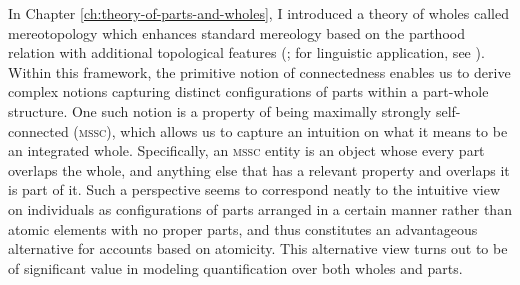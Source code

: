 In Chapter \ref{ch:theory-of-parts-and-wholes}, I introduced a theory of wholes called mereo\-topology which enhances standard mereology based on the parthood relation with additional topological features (\citealt{casati_varzi1999parts}; for linguistic application, see \citealt{grimm2012degrees,grimm2012number}). Within this framework, the primitive notion of connectedness enables us to derive complex notions capturing distinct configurations of parts within a part-whole structure. One such notion is a property of being maximally strongly self-connected (\textsc{mssc}), which allows us to capture an intuition on what it means to be an integrated whole. Specifically, an \textsc{mssc} entity is an object whose every part overlaps the whole, and anything else that has a relevant property and overlaps it is part of it. Such a perspective seems to correspond neatly to the intuitive view on individuals as configurations of parts arranged in a certain manner rather than atomic elements with no proper parts, and thus constitutes an advantageous alternative for accounts based on atomicity. This alternative view turns out to be of significant value in modeling quantification over both wholes and parts.

